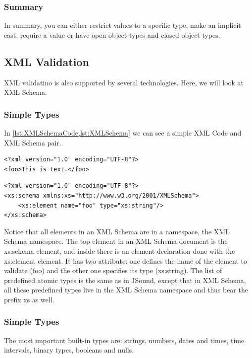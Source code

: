 \subsubsection{Summary}
In summary, you can either restrict values to a specific type, make an implicit cast, require a value or have open object types and closed object types.


\subsection{XML Validation}

XML validatino is also supported by several technologies. Here, we will look at XML Schema.

\subsubsection{Simple Types}

In \cref{lst:XMLSchemaCode,lst:XMLSchema} we can see a simple XML Code and XML Schema pair.

\begin{lstlisting}[style=XML,caption={XML Code},label={lst:XMLSchemaCode}]
<?xml version="1.0" encoding="UTF-8"?>
<foo>This is text.</foo>
\end{lstlisting}

\begin{lstlisting}[style=XML,caption={XML Schema},label={lst:XMLSchema}]
<?xml version="1.0" encoding="UTF-8"?>
<xs:schema xmlns:xs="http://www.w3.org/2001/XMLSchema">
    <xs:element name="foo" type="xs:string"/>
</xs:schema>
\end{lstlisting}

Notice that all elements in an XML Schema are in a namespace, the XML Schema namespace. The top element in an XML Schema document is the xs:schema element, and inside there is an element declaration done with the xs:element element. It has two attribute: one defines the name of the element to validate (foo) and the other one specifies its type (xs:string). The list of predefined atomic types is the same as in JSound, except that in XML Schema, all these predefined types live in the XML Schema namespace and thus bear the prefix xs as well.

\subsubsection{Simple Types}
The most important built-in types are: strings, numbers, dates and times, time intervals, binary types, booleans and nulls.

